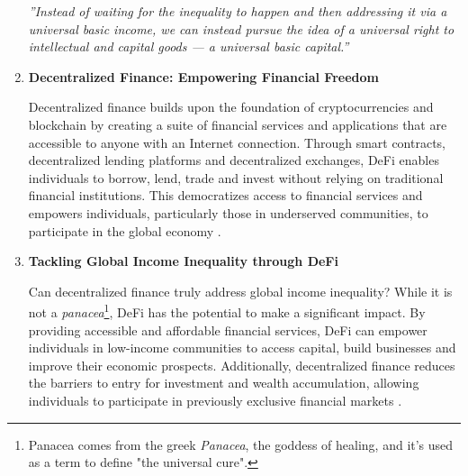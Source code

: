 \begin{enumerate}
\begin{flushright}
   \textsl{''Instead of waiting for the inequality to happen and then addressing it via a universal basic income, we can instead pursue the idea of a universal right to intellectual and capital goods — a universal basic capital.''} \cite{twp} \\

\end{flushright}

    \item \textbf{Decentralized Finance: Empowering Financial Freedom}

    Decentralized finance builds upon the foundation of cryptocurrencies and blockchain by creating a suite of financial services and applications that are accessible to anyone with an Internet connection. Through smart contracts, decentralized lending platforms and decentralized exchanges, DeFi enables individuals to borrow, lend, trade and invest without relying on traditional financial institutions. This democratizes access to financial services and empowers individuals, particularly those in underserved communities, to participate in the global economy \cite{twp, cwi, coint}.

    \item \textbf{Tackling Global Income Inequality through DeFi}

    Can decentralized finance truly address global income inequality? While it is not a \textit{panacea}\footnote{Panacea comes from the greek \textit{Panacea}, the goddess of healing, and it's used as a term to define "the universal cure".}, DeFi has the potential to make a significant impact. By providing accessible and affordable financial services, DeFi can empower individuals in low-income communities to access capital, build businesses and improve their economic prospects. Additionally, decentralized finance reduces the barriers to entry for investment and wealth accumulation, allowing individuals to participate in previously exclusive financial markets \cite{twp, cwi, coint}.

    
\end{enumerate}


